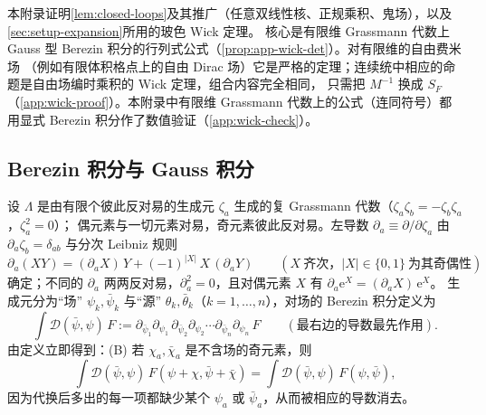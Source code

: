 \documentclass[UTF8,a4paper,11pt,fontset=fandol]{ctexart}
\theoremstyle{cplain}
\theoremstyle{cdefinition}
\theoremstyle{cremark}
\numberwithin{equation}{section}
\newcommand{\SF}{S_{F}}                              %
\newcommand{\ee}{\mathrm{e}}                        %
\begin{document}
本附录证明\cref{lem:closed-loops}及其推广（任意双线性核、正规乘积、鬼场），以及\cref{sec:setup-expansion}所用的玻色 Wick 定理。
核心是有限维 Grassmann 代数上 Gauss 型 Berezin 积分的行列式公式（\cref{prop:app-wick-det}）。对有限维的自由费米场
（例如有限体积格点上的自由 Dirac 场）它是严格的定理；连续统中相应的命题是自由场编时乘积的 Wick 定理，组合内容完全相同，
只需把 $M^{-1}$ 换成 $\SF$（\cref{app:wick-proof}）。本附录中有限维 Grassmann 代数上的公式（连同符号）都用显式 Berezin 积分作了数值验证（\cref{app:wick-check}）。

\subsection{Berezin 积分与 Gauss 积分}\label{app:wick-berezin}

设 $\Lambda$ 是由有限个彼此反对易的生成元 $\zeta_a$ 生成的复 Grassmann 代数（$\zeta_a\zeta_b=-\zeta_b\zeta_a$，$\zeta_a^2=0$）；
偶元素与一切元素对易，奇元素彼此反对易。左导数 $\partial_a\equiv\partial/\partial\zeta_a$ 由 $\partial_a\zeta_b=\delta_{ab}$ 与分次 Leibniz 规则
\begin{equation}\label{eq:app-wick-leibniz}
\partial_a(XY)=(\partial_aX)\,Y+(-1)^{|X|}\,X\,(\partial_aY)\qquad(X\ \text{齐次，}|X|\in\{0,1\}\ \text{为其奇偶性})
\end{equation}
确定；不同的 $\partial_a$ 两两反对易，$\partial_a^2=0$，且对偶元素 $X$ 有 $\partial_a\ee^{X}=(\partial_aX)\,\ee^{X}$。
生成元分为“场” $\psi_k,\bar\psi_k$ 与“源” $\theta_k,\bar\theta_k$（$k=1,\dots,n$），对场的 Berezin 积分定义为
\begin{equation}\label{eq:app-wick-berezin}
\int\!\mathcal D(\bar\psi,\psi)\,F:=\partial_{\bar\psi_1}\partial_{\psi_1}\,\partial_{\bar\psi_2}\partial_{\psi_2}\cdots\partial_{\bar\psi_n}\partial_{\psi_n}\,F
\qquad(\text{最右边的导数最先作用}).
\end{equation}
由定义立即得到：(B) 若 $\chi_a,\bar\chi_a$ 是不含场的奇元素，则
\begin{equation*}
\int\!\mathcal D(\bar\psi,\psi)\,F(\psi+\chi,\bar\psi+\bar\chi)=\int\!\mathcal D(\bar\psi,\psi)\,F(\psi,\bar\psi) ,
\end{equation*}
因为代换后多出的每一项都缺少某个 $\psi_a$ 或 $\bar\psi_a$，从而被相应的导数消去。
\end{document}
